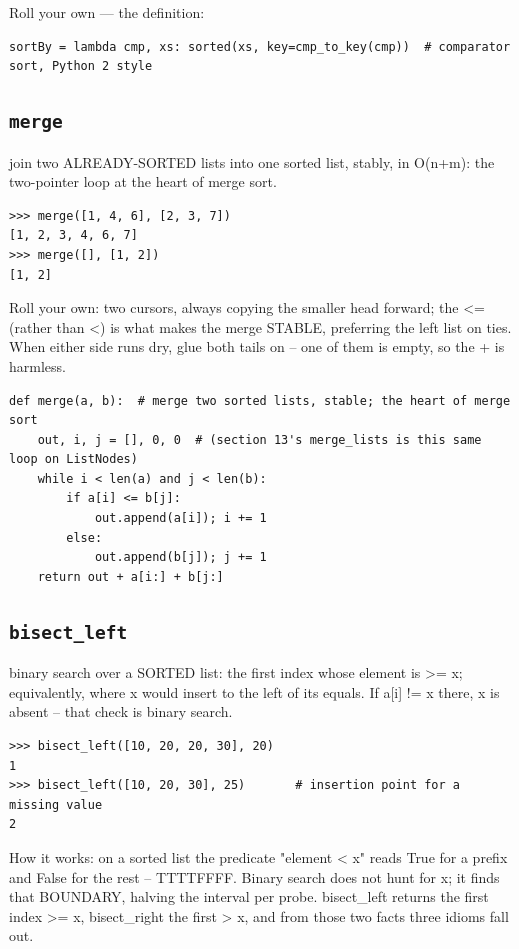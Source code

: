 \documentclass[10pt,letterpaper]{book}
\begin{document}
Roll your own --- the definition:

\begin{lstlisting}[style=ex]
sortBy = lambda cmp, xs: sorted(xs, key=cmp_to_key(cmp))  # comparator sort, Python 2 style
\end{lstlisting}
\subsection{\texttt{merge}}\label{def:merge}
join two ALREADY-SORTED lists into one sorted list, stably, in O(n+m): the two-pointer loop at the heart of merge sort.
\begin{lstlisting}[style=ex]
>>> merge([1, 4, 6], [2, 3, 7])
[1, 2, 3, 4, 6, 7]
>>> merge([], [1, 2])
[1, 2]
\end{lstlisting}

Roll your own: two cursors, always copying the smaller head forward; the <= (rather than <) is what makes the merge STABLE, preferring the left list on ties. When either side runs dry, glue both tails on -- one of them is empty, so the + is harmless.

\begin{lstlisting}[style=ex]
def merge(a, b):  # merge two sorted lists, stable; the heart of merge sort
    out, i, j = [], 0, 0  # (section 13's merge_lists is this same loop on ListNodes)
    while i < len(a) and j < len(b):
        if a[i] <= b[j]:
            out.append(a[i]); i += 1
        else:
            out.append(b[j]); j += 1
    return out + a[i:] + b[j:]
\end{lstlisting}

\subsection{\texttt{bisect\_left}}\label{def:bisect-left}
binary search over a SORTED list: the first index whose element is >= x; equivalently, where x would insert to the left of its equals. If a[i] != x there, x is absent -- that check is binary search.
\begin{lstlisting}[style=ex]
>>> bisect_left([10, 20, 20, 30], 20)
1
>>> bisect_left([10, 20, 30], 25)       # insertion point for a missing value
2
\end{lstlisting}

How it works: on a sorted list the predicate "element < x" reads True for a prefix and False for the rest -- TTTTFFFF. Binary search does not hunt for x; it finds that BOUNDARY, halving the interval per probe. bisect\_left returns the first index >= x, bisect\_right the first > x, and from those two facts three idioms fall out.
\end{document}
